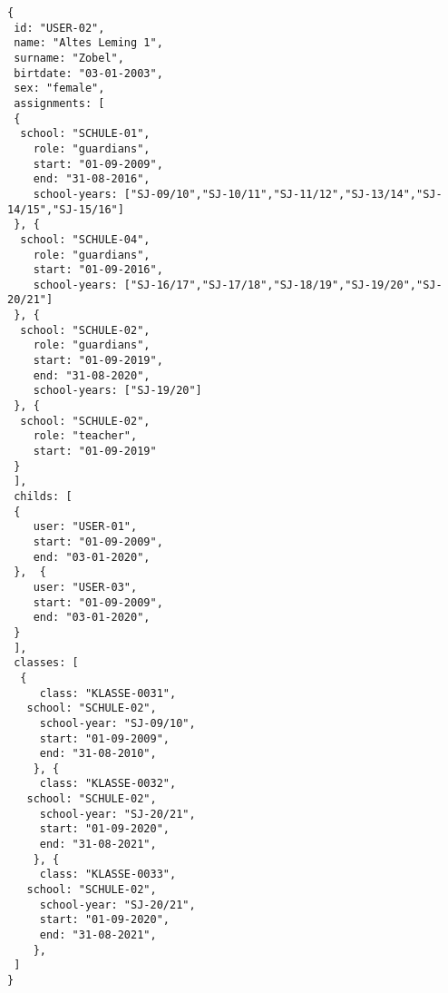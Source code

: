
\begin{lstlisting}[caption={Beispiel für Benutzer mit Rollen 'teachers' und 'guardians'},frame=tlrb]
{
 id: "USER-02",
 name: "Altes Leming 1",
 surname: "Zobel",
 birtdate: "03-01-2003",
 sex: "female",
 assignments: [
 {
  school: "SCHULE-01",
	role: "guardians",
	start: "01-09-2009",
	end: "31-08-2016",
	school-years: ["SJ-09/10","SJ-10/11","SJ-11/12","SJ-13/14","SJ-14/15","SJ-15/16"]
 }, {
  school: "SCHULE-04",
	role: "guardians",
	start: "01-09-2016",
	school-years: ["SJ-16/17","SJ-17/18","SJ-18/19","SJ-19/20","SJ-20/21"]
 }, {
  school: "SCHULE-02",
	role: "guardians",
	start: "01-09-2019",
	end: "31-08-2020",
	school-years: ["SJ-19/20"]
 }, {
  school: "SCHULE-02",
	role: "teacher",
	start: "01-09-2019"
 }
 ],
 childs: [
 {
	user: "USER-01",
	start: "01-09-2009",
	end: "03-01-2020",
 },  {
	user: "USER-03",
	start: "01-09-2009",
	end: "03-01-2020",
 }
 ],
 classes: [
  {
	 class: "KLASSE-0031",
   school: "SCHULE-02",
	 school-year: "SJ-09/10",
	 start: "01-09-2009",
	 end: "31-08-2010",
	}, {
	 class: "KLASSE-0032",
   school: "SCHULE-02",
	 school-year: "SJ-20/21",
	 start: "01-09-2020",
	 end: "31-08-2021",
	}, {
	 class: "KLASSE-0033",
   school: "SCHULE-02",
	 school-year: "SJ-20/21",
	 start: "01-09-2020",
	 end: "31-08-2021",
	}, 
 ]
}
\end{lstlisting}